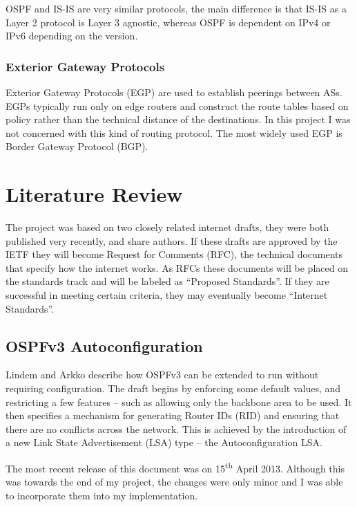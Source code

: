 \documentclass[12pt,a4paper,twoside]{report}
\begin{document}
OSPF and IS-IS are very similar protocols, the main difference is that IS-IS as
a Layer 2 protocol is Layer 3 agnostic, whereas OSPF is dependent on IPv4 or
IPv6 depending on the version.

\subsection{Exterior Gateway Protocols}
Exterior Gateway Protocols (EGP) 
are used to establish peerings between ASs. EGPs typically run only on edge
routers and construct the route tables based on policy rather than the
technical distance of the destinations. In this project I was not concerned
with this kind of routing protocol.  The most widely used EGP is Border
Gateway Protocol (BGP).



\chapter{Literature Review} 
The project was based on two closely related internet drafts, they were both
published very recently, and share authors. If these drafts are approved by the
IETF they will become Request for Comments (RFC), the technical documents that specify how the internet works. As RFCs
these documents will be placed on the standards track and will be labeled as
``Proposed Standards''. If they are successful in meeting certain criteria,
they may eventually become ``Internet Standards''\cite{rfc6410}.

\section{OSPFv3 Autoconfiguration}
Lindem and Arkko\cite{draft-ietf-ospf-ospfv3-autoconfig-02} describe how OSPFv3
can be extended to run without requiring configuration. The draft begins
by enforcing some default values, and restricting a few features -- such as
allowing only the backbone area to be used. It then specifies a mechanism for
generating Router IDs (RID)  and ensuring that
there are no conflicts across the network. This is achieved by the introduction
of a new Link State Advertisement (LSA)  type -- the Autoconfiguration LSA. 

The most recent release of this document was on 15\textsuperscript{th} April
2013. Although this was towards the end of my project, the changes were only
minor and I was able to incorporate them into my implementation.
\end{document}
